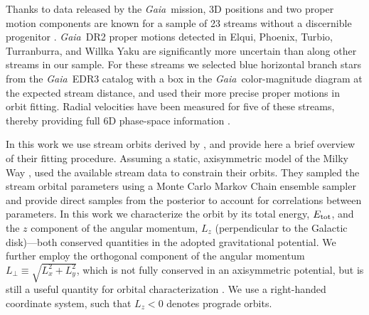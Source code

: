 \documentclass[twocolumn]{aastex63}
\newcommand{\gaia}{\textsl{Gaia}}
\begin{document}
Thanks to data released by the \gaia\ mission, 3D positions and two proper motion components are known for a sample of 23 streams without a discernible progenitor \citep{ibata2019, shipp2019, riley2020}.
\gaia\ DR2 proper motions detected in Elqui, Phoenix, Turbio, Turranburra, and Willka Yaku are significantly more uncertain than along other streams in our sample.
For these streams we selected blue horizontal branch stars from the \gaia\ EDR3 catalog \citep{gaiaedr3} with a box in the \gaia\ color-magnitude diagram at the expected stream distance, and used their more precise proper motions in orbit fitting.
Radial velocities have been measured for five of these streams, thereby providing full 6D phase-space information \citep{caldwell2020, li2020, bonaca2020b}.


In this work we use stream orbits derived by \citet{bk2021}, and provide here a brief overview of their fitting procedure.
Assuming a static, axisymmetric model of the Milky Way \citep[v1.2 \texttt{MilkyWayPotential}]{gala}, \citet{bk2021} used the available stream data to constrain their orbits.
They sampled the stream orbital parameters using a Monte Carlo Markov Chain ensemble sampler and provide direct samples from the posterior to account for correlations between parameters.
In this work we characterize the orbit by its total energy, $E_{\rm tot}$, and the $z$ component of the angular momentum, $L_z$ (perpendicular to the Galactic disk)---both conserved quantities in the adopted gravitational potential.
We further employ the orthogonal component of the angular momentum $L_\perp \equiv \sqrt{L_x^2 + L_y^2}$, which is not fully conserved in an axisymmetric potential, but is still a useful quantity for orbital characterization \citep{helmi1999}.
We use a right-handed coordinate system, such that $L_z<0$ denotes prograde orbits.
\end{document}
